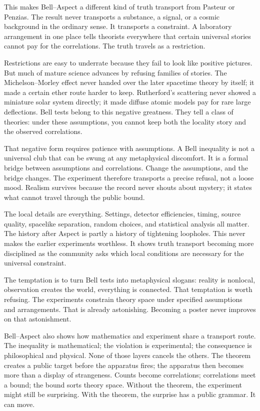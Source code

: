 This makes Bell--Aspect a different kind of truth transport from Pasteur
or Penzias. The result never transports a substance, a signal, or a
cosmic background in the ordinary sense. It transports a constraint. A
laboratory arrangement in one place tells theorists everywhere that
certain universal stories cannot pay for the correlations. The truth
travels as a restriction.

Restrictions are easy to underrate because they fail to look like
positive pictures. But much of mature science advances by refusing
families of stories. The Michelson--Morley effect never handed over the
later spacetime theory by itself; it made a certain ether route harder to
keep. Rutherford's scattering never showed a miniature solar system
directly; it made diffuse atomic models pay for rare large deflections.
Bell tests belong to this negative greatness. They tell a class of
theories: under these assumptions, you cannot keep both the locality
story and the observed correlations.

That negative form requires patience with assumptions. A Bell inequality
is not a universal club that can be swung at any metaphysical discomfort.
It is a formal bridge between assumptions and correlations. Change the
assumptions, and the bridge changes. The experiment therefore transports
a precise refusal, not a loose mood. Realism survives because the record
never shouts about mystery; it states what cannot travel through the
public bound.

The local details are everything. Settings, detector efficiencies,
timing, source quality, spacelike separation, random choices, and
statistical analysis all matter. The history after Aspect is partly a
history of tightening loopholes. This never makes the earlier experiments
worthless. It shows truth transport becoming more disciplined as the
community asks which local conditions are necessary for the universal
constraint.

The temptation is to turn Bell tests into metaphysical slogans: reality
is nonlocal, observation creates the world, everything is connected.
That temptation is worth refusing. The experiments constrain theory space
under specified assumptions and arrangements. That is already
astonishing. Becoming a poster never improves on that astonishment.

Bell--Aspect also shows how mathematics and experiment share a transport
route. The inequality is mathematical; the violation is experimental;
the consequence is philosophical and physical. None of those layers
cancels the others. The theorem creates a public target before the
apparatus fires; the apparatus then becomes more than a display of
strangeness. Counts become correlations; correlations meet a bound; the
bound sorts theory space. Without the theorem, the experiment might
still be surprising. With the theorem, the surprise has a public grammar.
It can move.

